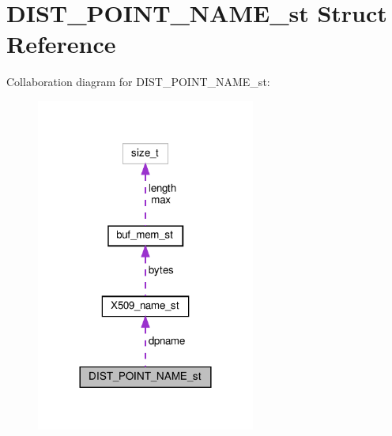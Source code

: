 \hypertarget{structDIST__POINT__NAME__st}{}\section{D\+I\+S\+T\+\_\+\+P\+O\+I\+N\+T\+\_\+\+N\+A\+M\+E\+\_\+st Struct Reference}
\label{structDIST__POINT__NAME__st}


Collaboration diagram for D\+I\+S\+T\+\_\+\+P\+O\+I\+N\+T\+\_\+\+N\+A\+M\+E\+\_\+st\+:
\nopagebreak
\begin{figure}[H]
\begin{center}
\leavevmode
\includegraphics[width=204pt]{structDIST__POINT__NAME__st__coll__graph}
\end{center}
\end{figure}
